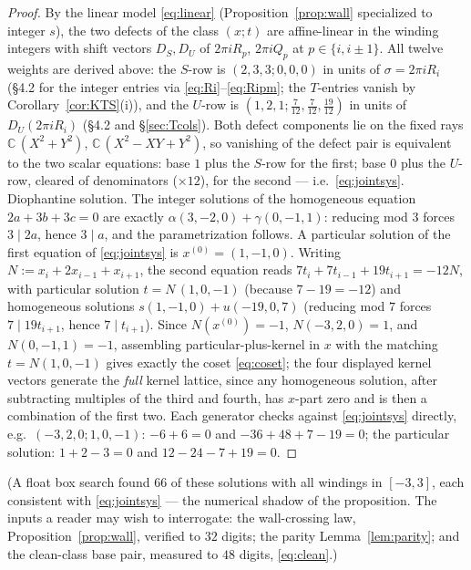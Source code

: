 \documentclass[11pt]{article}
\theoremstyle{definition}
\theoremstyle{remark}
\newcommand{\CC}{\mathbb{C}}
\begin{document}
\begin{proof}
By the linear model \eqref{eq:linear} (Proposition~\ref{prop:wall} specialized to
integer $s$), the two defects of the class
$(x;t)$ are affine-linear in the winding integers with shift vectors
$D_S,D_U$ of $2\pi iR_p$, $2\pi iQ_p$ at $p\in\{i,i\pm1\}$.  All twelve weights are
derived above: the $S$-row is $(2,3,3;0,0,0)$ in units of $\sigma=2\pi iR_i$ (\S4.2 for the
integer entries via \eqref{eq:Ri}--\eqref{eq:Ripm}; the $T$-entries vanish by
Corollary~\ref{cor:KTS}(i)), and the $U$-row is
$(1,2,1;\tfrac7{12},\tfrac7{12},\tfrac{19}{12})$ in units of $D_U(2\pi iR_i)$ (\S4.2 and
\S\ref{sec:Tcols}).  Both defect components lie on the fixed rays $\CC\,(X^2{+}Y^2)$,
$\CC\,(X^2{-}XY{+}Y^2)$, so vanishing of the defect pair is equivalent to the two scalar
equations: base $1$ plus the $S$-row for the first; base $0$ plus the $U$-row, cleared of
denominators ($\times12$), for the second --- i.e.\ \eqref{eq:jointsys}.
Diophantine solution.  The integer solutions of the homogeneous equation $2a+3b+3c=0$
are exactly $\alpha(3,-2,0)+\gamma(0,-1,1)$: reducing mod $3$ forces $3\mid 2a$, hence
$3\mid a$, and the parametrization follows.  A particular solution of the first equation
of \eqref{eq:jointsys} is $x^{(0)}=(1,-1,0)$.  Writing $N:=x_i+2x_{i-1}+x_{i+1}$, the
second equation reads $7t_i+7t_{i-1}+19t_{i+1}=-12N$, with particular solution
$t=N\,(1,0,-1)$ (because $7-19=-12$) and homogeneous solutions $s(1,-1,0)+u(-19,0,7)$
(reducing mod $7$ forces $7\mid 19t_{i+1}$, hence $7\mid t_{i+1}$).  Since
$N(x^{(0)})=-1$, $N(-3,2,0)=1$, and $N(0,-1,1)=-1$, assembling particular-plus-kernel in
$x$ with the matching $t=N(1,0,-1)$ gives exactly the coset \eqref{eq:coset}; the four
displayed kernel vectors generate the \emph{full} kernel lattice, since any homogeneous
solution, after subtracting multiples of the third and fourth, has $x$-part zero and is
then a combination of the first two.  Each generator checks against
\eqref{eq:jointsys} directly, e.g.\ $(-3,2,0;1,0,-1)$: $-6+6=0$ and $-36+48+7-19=0$;
the particular solution: $1+2-3=0$ and $12-24-7+19=0$.
\end{proof}

\noindent
(A float box search found $66$ of these solutions with all windings in $[-3,3]$, each
consistent with \eqref{eq:jointsys} --- the numerical shadow of the proposition.  The
inputs a reader may wish to interrogate: the wall-crossing law, Proposition~\ref{prop:wall},
verified to $32$ digits; the parity Lemma~\ref{lem:parity}; and the clean-class base pair,
measured to $48$ digits, \eqref{eq:clean}.)
\end{document}
